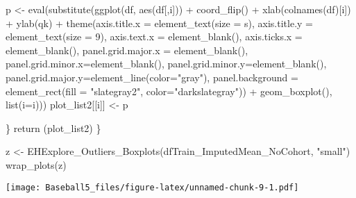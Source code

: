 \documentclass[
]{article}
\newenvironment{Shaded}{\begin{snugshade}}{\end{snugshade}}
\newcommand{\AttributeTok}[1]{\textcolor[rgb]{0.77,0.63,0.00}{#1}}
\newcommand{\DecValTok}[1]{\textcolor[rgb]{0.00,0.00,0.81}{#1}}
\newcommand{\FunctionTok}[1]{\textcolor[rgb]{0.00,0.00,0.00}{#1}}
\newcommand{\NormalTok}[1]{#1}
\newcommand{\OtherTok}[1]{\textcolor[rgb]{0.56,0.35,0.01}{#1}}
\newcommand{\SpecialCharTok}[1]{\textcolor[rgb]{0.00,0.00,0.00}{#1}}
\newcommand{\StringTok}[1]{\textcolor[rgb]{0.31,0.60,0.02}{#1}}
\begin{document}
\begin{Shaded}
\begin{Highlighting}[]
\NormalTok{  p }\OtherTok{\textless{}{-}} \FunctionTok{eval}\NormalTok{(}\FunctionTok{substitute}\NormalTok{(}\FunctionTok{ggplot}\NormalTok{(df, }\FunctionTok{aes}\NormalTok{(df[,i])) }\SpecialCharTok{+}
          \FunctionTok{coord\_flip}\NormalTok{() }\SpecialCharTok{+}  
          \FunctionTok{xlab}\NormalTok{(}\FunctionTok{colnames}\NormalTok{(df)[i])  }\SpecialCharTok{+}
          \FunctionTok{ylab}\NormalTok{(qk) }\SpecialCharTok{+}
          \FunctionTok{theme}\NormalTok{(}\AttributeTok{axis.title.x =} \FunctionTok{element\_text}\NormalTok{(}\AttributeTok{size =}\NormalTok{ s), }\AttributeTok{axis.title.y =} \FunctionTok{element\_text}\NormalTok{(}\AttributeTok{size =} \DecValTok{9}\NormalTok{), }\AttributeTok{axis.text.x =} \FunctionTok{element\_blank}\NormalTok{(), }\AttributeTok{axis.ticks.x =} \FunctionTok{element\_blank}\NormalTok{(), }\AttributeTok{panel.grid.major.x =} \FunctionTok{element\_blank}\NormalTok{(), }\AttributeTok{panel.grid.minor.x=}\FunctionTok{element\_blank}\NormalTok{(), }\AttributeTok{panel.grid.minor.y=}\FunctionTok{element\_blank}\NormalTok{(), }\AttributeTok{panel.grid.major.y=}\FunctionTok{element\_line}\NormalTok{(}\AttributeTok{color=}\StringTok{"gray"}\NormalTok{), }\AttributeTok{panel.background =} \FunctionTok{element\_rect}\NormalTok{(}\AttributeTok{fill =} \StringTok{"slategray2"}\NormalTok{, }\AttributeTok{color=}\StringTok{"darkslategray"}\NormalTok{))  }\SpecialCharTok{+} 
          \FunctionTok{geom\_boxplot}\NormalTok{(), }\FunctionTok{list}\NormalTok{(}\AttributeTok{i=}\NormalTok{i)))}
\NormalTok{  plot\_list2[[i]] }\OtherTok{\textless{}{-}}\NormalTok{ p }
  
  
\NormalTok{\}}
\FunctionTok{return}\NormalTok{ (plot\_list2)}
\NormalTok{\}}


\NormalTok{z }\OtherTok{\textless{}{-}} \FunctionTok{EHExplore\_Outliers\_Boxplots}\NormalTok{(dfTrain\_ImputedMean\_NoCohort, }\StringTok{"small"}\NormalTok{)}
\FunctionTok{wrap\_plots}\NormalTok{(z)}
\end{Highlighting}
\end{Shaded}

\texttt{[image: Baseball5\_files/figure-latex/unnamed-chunk-9-1.pdf]}
\end{document}

